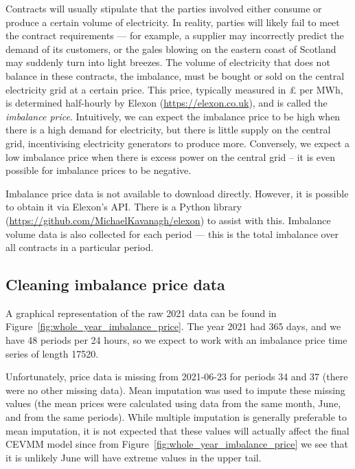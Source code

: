 \documentclass[11pt,twoside,openany]{book}
\numberwithin{Theorem}{chapter}
\numberwithin{Definition}{chapter}
\numberwithin{Lemma}{chapter}
\numberwithin{Algorithm}{chapter}
\numberwithin{equation}{chapter}
\begin{document}
Contracts will usually stipulate that the parties involved either consume or
produce a certain volume of electricity. In reality, parties will likely fail to
meet the contract requirements --- for example, a supplier may incorrectly predict the demand of its customers,
or the gales blowing on the eastern coast of Scotland may suddenly turn into
light breezes. The volume of electricity that does not balance in these
contracts, the imbalance, must be bought or sold on the central
electricity grid at a certain price. This price, typically
measured in £ per MWh, is determined half-hourly by
Elexon (\url{https://elexon.co.uk}), and is called the {\it imbalance price}.
Intuitively, we can expect the imbalance price to be high when there is
a high demand for electricity, but there is little supply on the central grid,
incentivising electricity generators to produce more. Conversely, we expect
a low imbalance price when there is excess power on the central grid -- it is even
possible for imbalance prices to be negative.

Imbalance price data is not available to download directly. However, it is
possible to obtain it via Elexon's API. There is a Python library
(\url{https://github.com/MichaelKavanagh/elexon}) to assist with this.
Imbalance volume data is also collected for each period --- this is
the total imbalance over all contracts in a particular period.

\subsection{Cleaning imbalance price data}\label{sec:cleaning_imbalance}

A graphical representation of the raw 2021 data can be found in
Figure~\ref{fig:whole_year_imbalance_price}. The year 2021 had 365 days, and we have 48
periods per 24 hours, so we expect to work with an imbalance price time series of
length 17520.

Unfortunately, price data is missing from 2021-06-23 for periods 34 and 37
(there were no other missing data). Mean imputation was used to impute these
missing values (the mean prices were calculated using data from the same month, June, and from the same
periods). While multiple imputation is generally preferable to mean imputation, it is not
expected that these values will actually affect the final CEVMM model since
from Figure~\ref{fig:whole_year_imbalance_price} we see that it is unlikely June will have
extreme values in the upper tail.
\end{document}
